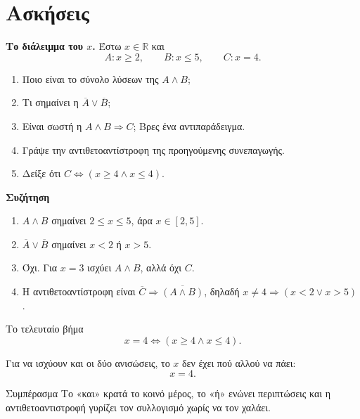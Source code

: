 \documentclass{presentation}
\begin{document}
\moodle

\section{Ασκήσεις}

\exercises

\begin{askisi}
  \textbf{Το διάλειμμα του $x$.} Έστω $x\in\mathbb{R}$ και
  \[
    A: x\ge2,\qquad B: x\le5,\qquad C: x=4.
  \]

  \begin{enumerate}[<+->]
    \item Ποιο είναι το σύνολο λύσεων της $A\wedge B$;
    \item Τι σημαίνει η $\overline{A}\vee\overline{B}$;
    \item Είναι σωστή η $A\wedge B\Rightarrow C$; Βρες ένα αντιπαράδειγμα.
    \item Γράψε την αντιθετοαντίστροφη της προηγούμενης συνεπαγωγής.
    \item Δείξε ότι $C\Leftrightarrow(x\ge4\wedge x\le4)$.
  \end{enumerate}
\end{askisi}

\begin{lisi}
  \textbf{Συζήτηση}
  \begin{enumerate}[<+->]
    \item $A\wedge B$ σημαίνει $2\le x\le5$, άρα $x\in[2,5]$.
    \item $\overline{A}\vee\overline{B}$ σημαίνει $x<2$ ή $x>5$.
    \item Όχι. Για $x=3$ ισχύει $A\wedge B$, αλλά όχι $C$.
    \item Η αντιθετοαντίστροφη είναι
          $\overline{C}\Rightarrow\overline{(A\wedge B)}$, δηλαδή
          $x\ne4\Rightarrow(x<2\vee x>5)$.
  \end{enumerate}
\end{lisi}

\begin{frame}{Το τελευταίο βήμα}
  \[
    x=4\Leftrightarrow(x\ge4\wedge x\le4).
  \]

  Για να ισχύουν και οι δύο ανισώσεις, το $x$ δεν έχει πού αλλού να πάει:
  \[
    x=4.
  \]

  \begin{block}{Συμπέρασμα}
    Το «και» κρατά το κοινό μέρος, το «ή» ενώνει περιπτώσεις και η
    αντιθετοαντιστροφή γυρίζει τον συλλογισμό χωρίς να τον χαλάει.
  \end{block}
\end{frame}
\end{document}
